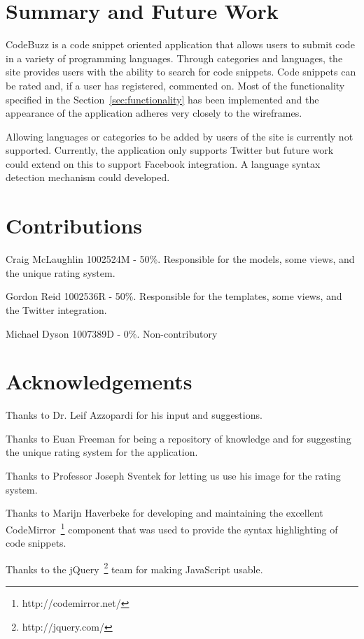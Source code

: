 \documentclass{sig-alt-release2}
\begin{document}
\section{Summary and Future Work}

CodeBuzz is a code snippet oriented application that allows users to submit code
in a variety of programming languages. Through categories and languages,
the site provides users with the ability to search for code snippets.
Code snippets can be rated and, if a user has registered, commented on.
Most of the functionality specified in the
Section~\ref{sec:functionality} has been implemented and the appearance
of the application adheres very closely to the wireframes.

Allowing languages or categories to be added by users of the site is
currently not supported.
Currently, the application only supports Twitter but future work could
extend on this to support Facebook integration. A language syntax
detection mechanism could developed.

\section{Contributions}

Craig McLaughlin 1002524M - 50\%. Responsible for the models, some views, and
the unique rating system.

Gordon Reid 1002536R - 50\%. Responsible for the templates, some views, and the
Twitter integration.

Michael Dyson 1007389D - 0\%. Non-contributory

\section{Acknowledgements}

Thanks to Dr. Leif Azzopardi for his input and suggestions.

Thanks to Euan Freeman for being a repository of knowledge and for
suggesting the unique rating system for the application.

Thanks to Professor Joseph Sventek for letting us use his image for the
rating system.

Thanks to Marijn Haverbeke for developing and maintaining the excellent
CodeMirror~\footnote{http://codemirror.net/} component that was used to
provide the syntax highlighting of code snippets.

Thanks to the jQuery~\footnote{http://jquery.com/} team for making
JavaScript usable.
\end{document}
